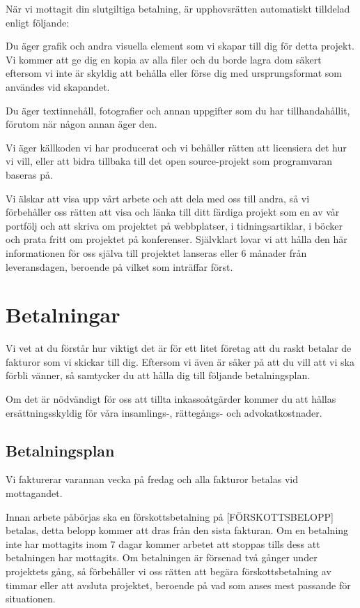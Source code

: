 \documentclass[10pt,a4paper,parskip]{scrartcl}
\begin{document}
När vi mottagit din slutgiltiga betalning, är upphovsrätten automatiskt
tilldelad enligt följande:

Du äger grafik och andra visuella element som vi skapar till dig för detta
projekt. Vi kommer att ge dig en kopia av alla filer och du borde lagra dom
säkert eftersom vi inte är skyldig att behålla eller förse dig med
ursprungsformat som användes vid skapandet.

Du äger textinnehåll, fotografier och annan uppgifter som du har
tillhandahållit, förutom när någon annan äger den.

Vi äger källkoden vi har producerat och vi behåller rätten att licensiera det
hur vi vill, eller att bidra tillbaka till det open source-projekt som
programvaran baseras på.

Vi älskar att visa upp vårt arbete och att dela med oss till andra, så vi
förbehåller oss rätten att visa och länka till ditt färdiga projekt som en av
vår portfölj och att skriva om projektet på webbplatser, i tidningsartiklar, i
böcker och prata fritt om projektet på konferenser. Självklart lovar vi att
hålla den här informationen för oss själva till projektet lanseras eller 6
månader från leveransdagen, beroende på vilket som inträffar först.

\section{Betalningar}

Vi vet at du förstår hur viktigt det är för ett litet företag att du raskt
betalar de fakturor som vi skickar till dig. Eftersom vi även är säker på att
du vill att vi ska förbli vänner, så samtycker du att hålla dig till följande
betalningsplan.

Om det är nödvändigt för oss att tillta inkassoåtgärder kommer du att hållas
ersättningsskyldig för våra insamlings-, rättegångs- och advokatkostnader.

\subsection{Betalningsplan}
Vi fakturerar varannan vecka på fredag och alla fakturor betalas vid
mottagandet.

Innan arbete påbörjas ska en förskottsbetalning på [FÖRSKOTTSBELOPP] betalas,
detta belopp kommer att dras från den sista fakturan. Om en betalning inte har
mottagits inom 7 dagar kommer arbetet att stoppas tills dess att betalningen
har mottagits. Om betalningen är försenad två gånger under projektets gång, så
förbehåller vi oss rätten att begära förskottsbetalning av timmar eller att
avsluta projektet, beroende på vad som anses mest passande för situationen.
\end{document}
